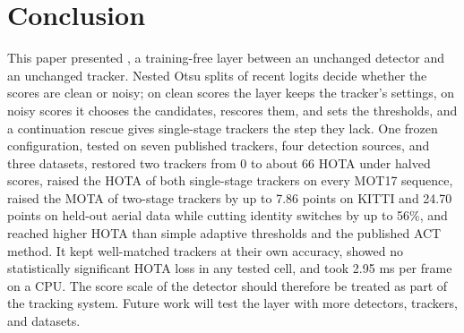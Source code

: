 \section{Conclusion}\label{sec:conclusion}

This paper presented \scl{}, a training-free layer between an unchanged detector and an unchanged
tracker. Nested Otsu splits of recent logits decide whether the scores are clean or noisy; on clean
scores the layer keeps the tracker's settings, on noisy scores it chooses the candidates, rescores
them, and sets the thresholds, and a continuation rescue gives single-stage trackers the step they
lack. One frozen configuration, tested on seven published trackers, four detection sources, and
three datasets, restored two trackers from 0 to about 66 HOTA under halved scores, raised the HOTA
of both single-stage trackers on every MOT17 sequence, raised the MOTA of two-stage trackers by up to 7.86 points
on KITTI and 24.70 points on held-out aerial data while cutting identity switches by up to 56\%, and
reached higher HOTA than simple adaptive thresholds and the published ACT method. It kept well-matched trackers
at their own accuracy, showed no statistically significant HOTA loss in any tested cell, and took
2.95 ms per frame on a CPU. The score scale of the detector should therefore be treated as part of
the tracking system. Future work will test the layer with more detectors, trackers, and datasets.
